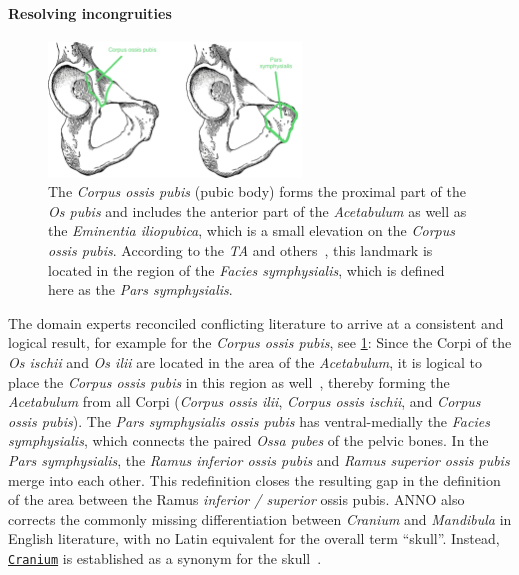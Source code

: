 \documentclass[sw]{iosart2x}
\newcommand{\anno}[1]{\href{https://annosaxfdm.de/ontology/#1}{\texttt{#1}}}
\begin{document}

\paragraph{Resolving incongruities}
\begin{figure}[h]
\centering
\includegraphics[width=0.6\textwidth]{img/corpus_ossis_pubis.png}
\caption{The \emph{Corpus ossis pubis} (pubic body) forms the proximal part of the \emph{Os pubis} and includes the anterior part of the \emph{Acetabulum} as well as the \emph{Eminentia iliopubica}, which is a small elevation on the \emph{Corpus ossis pubis}.
According to the \emph{TA} and others~\citep{ta2,schemamann,anatomylexicon2007,drake2019gray,anatomylexicon,prometheus2,anatomie}, this landmark is located in the region of the \emph{Facies symphysialis}, which is defined here as the \emph{Pars symphysialis}.
}\label{fig:corpusossispubis}
\end{figure}

The domain experts reconciled conflicting literature to arrive at a consistent and logical result, for example for the \emph{Corpus ossis pubis}, see \cref{fig:corpusossispubis}:
Since the Corpi of the \emph{Os ischii} and \emph{Os ilii} are located in the area of the \emph{Acetabulum},
it is logical to place the \emph{Corpus ossis pubis} in this region as well~\citep{graysanatomy,waldeyer,allgemeineanatomie,datacollection2,romanianmandible}, thereby forming the \emph{Acetabulum} from all Corpi (\emph{Corpus ossis ilii}, \emph{Corpus ossis ischii}, and \emph{Corpus ossis pubis}).
The \emph{Pars symphysialis ossis pubis} has ventral-medially the \emph{Facies symphysialis}, which connects the paired \emph{Ossa pubes} of the pelvic bones.
In the \emph{Pars symphysialis}, the \emph{Ramus inferior ossis pubis} and \emph{Ramus superior ossis pubis} merge into each other.
This redefinition closes the resulting gap in the definition of the area between the Ramus \emph{inferior / superior} ossis pubis.
%
ANNO also corrects the commonly missing differentiation between \emph{Cranium} and \emph{Mandibula} in English literature, with no Latin equivalent for the overall term \enquote{skull}.
Instead, \anno{Cranium} is established as a synonym for the skull~\citep{allgemeineanatomieen,prometheus2}.
\end{document}
